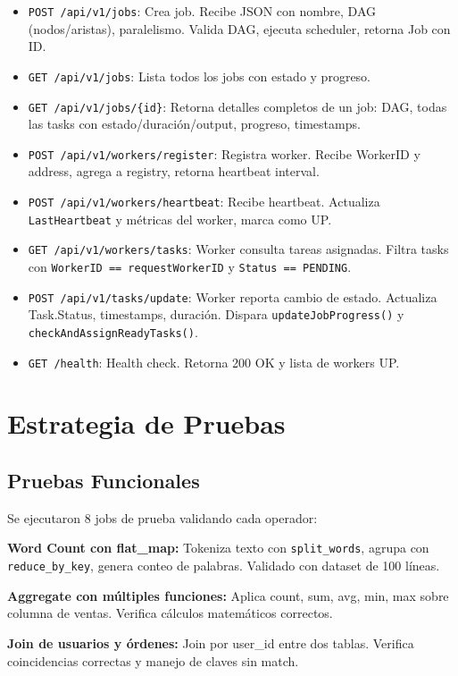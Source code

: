 \documentclass[conference]{IEEEtran}
\begin{document}
\begin{itemize}
\item \texttt{POST /api/v1/jobs}: Crea job. Recibe JSON con nombre, DAG (nodos/aristas), paralelismo. Valida DAG, ejecuta scheduler, retorna Job con ID.
\item \texttt{GET /api/v1/jobs}: Lista todos los jobs con estado y progreso.
\item \texttt{GET /api/v1/jobs/\{id\}}: Retorna detalles completos de un job: DAG, todas las tasks con estado/duración/output, progreso, timestamps.
\item \texttt{POST /api/v1/workers/register}: Registra worker. Recibe WorkerID y address, agrega a registry, retorna heartbeat interval.
\item \texttt{POST /api/v1/workers/heartbeat}: Recibe heartbeat. Actualiza \texttt{LastHeartbeat} y métricas del worker, marca como UP.
\item \texttt{GET /api/v1/workers/tasks}: Worker consulta tareas asignadas. Filtra tasks con \texttt{WorkerID == requestWorkerID} y \texttt{Status == PENDING}.
\item \texttt{POST /api/v1/tasks/update}: Worker reporta cambio de estado. Actualiza Task.Status, timestamps, duración. Dispara \texttt{updateJobProgress()} y \texttt{checkAndAssignReadyTasks()}.
\item \texttt{GET /health}: Health check. Retorna 200 OK y lista de workers UP.
\end{itemize}

\section{Estrategia de Pruebas}\label{sec:pruebas}

\subsection{Pruebas Funcionales}

Se ejecutaron 8 jobs de prueba validando cada operador:

\textbf{Word Count con flat\_map:} Tokeniza texto con \texttt{split\_words}, agrupa con \texttt{reduce\_by\_key}, genera conteo de palabras. Validado con dataset de 100 líneas.

\textbf{Aggregate con múltiples funciones:} Aplica count, sum, avg, min, max sobre columna de ventas. Verifica cálculos matemáticos correctos.

\textbf{Join de usuarios y órdenes:} Join por user\_id entre dos tablas. Verifica coincidencias correctas y manejo de claves sin match.
\end{document}
